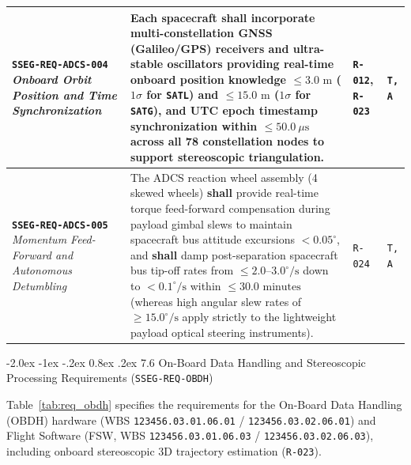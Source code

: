 \documentclass[11pt,a4paper]{article}
\makeatletter
\renewcommand\subsubsection{\@startsection{subsubsection}{3}{\z@}%
    {-2.0ex \@plus -1ex \@minus -.2ex}%
    {0.8ex \@plus .2ex}%
    {\normalfont\normalsize\bfseries\sffamily\color{SubHeadingBlue}}}
\providecommand{\abbr}[1]{#1}
\makeatother
\begin{document}
{\begin{longtable}{|>{\raggedright\arraybackslash}p{}|>{\raggedright\arraybackslash}p{}|>{\raggedright\arraybackslash}p{}|>{\raggedright\arraybackslash}p{}|}
\textbf{\texttt{SSEG-REQ-ADCS-004}} \newline \emph{Onboard Orbit Position and Time Synchronization} & Each spacecraft \textbf{shall} incorporate multi-constellation \abbr{GNSS} (Galileo/GPS) receivers and ultra-stable oscillators providing real-time onboard position knowledge $\le 3.0\text{ m}$ ($1\sigma$ for \texttt{SATL}) and $\le 15.0\text{ m}$ ($1\sigma$ for \texttt{SATG}), and UTC epoch timestamp synchronization within $\le 50.0~\mu\mathrm{s}$ across all 78 constellation nodes to support stereoscopic triangulation. & \texttt{R-012}, \newline \texttt{R-023} & \texttt{T, A} \\ \hline
\textbf{\texttt{SSEG-REQ-ADCS-005}} \newline \emph{Momentum Feed-Forward and Autonomous Detumbling} & The \abbr{ADCS} reaction wheel assembly (4 skewed wheels) \textbf{shall} provide real-time torque feed-forward compensation during payload gimbal slews to maintain spacecraft bus attitude excursions $< 0.05^\circ$, and \textbf{shall} damp post-separation spacecraft bus tip-off rates from $\le 2.0\text{--}3.0^\circ/\text{s}$ down to $< 0.1^\circ/\text{s}$ within $\le 30.0\text{ minutes}$ (whereas high angular slew rates of $\ge 15.0^\circ/\text{s}$ apply strictly to the lightweight payload optical steering instruments). & \texttt{R-024} & \texttt{T, A} \\ \hline
\end{longtable}}

\subsubsection{7.6 On-Board Data Handling and Stereoscopic Processing Requirements (\texttt{SSEG-REQ-OBDH})}

Table~\ref{tab:req_obdh} specifies the requirements for the On-Board Data Handling (\abbr{OBDH}) hardware (\abbr{WBS} \texttt{123456.03.01.06.01} / \texttt{123456.03.02.06.01}) and Flight Software (\abbr{FSW}, \abbr{WBS} \texttt{123456.03.01.06.03} / \texttt{123456.03.02.06.03}), including onboard stereoscopic 3D trajectory estimation (\texttt{R-023}).
\end{document}
